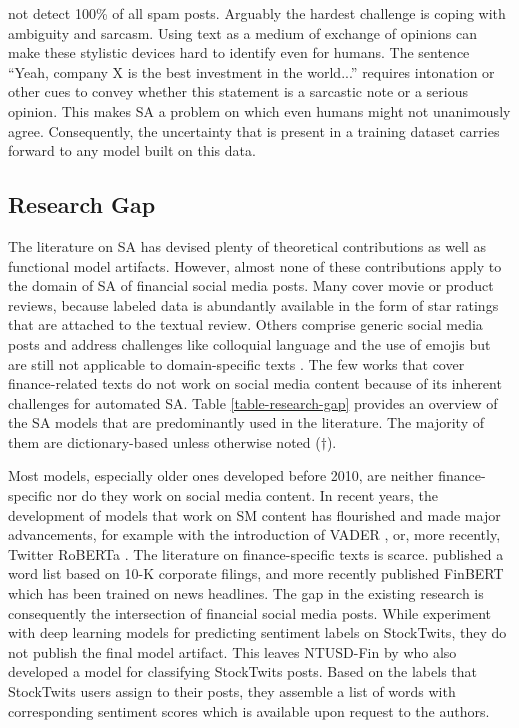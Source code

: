 not detect 100\% of all spam posts. Arguably the hardest challenge is coping with ambiguity and sarcasm. Using text as a medium of exchange of opinions can make these stylistic devices hard to identify even for humans. The sentence ``Yeah, company X is the best investment in the world...'' requires intonation or other cues to convey whether this statement is a sarcastic note or a serious opinion. This makes SA a problem on which even humans might not unanimously agree. Consequently, the uncertainty that is present in a training dataset carries forward to any model built on this data.







\subsection{Research Gap}
\label{section-research-gap}
The literature on SA has devised plenty of theoretical contributions as well as functional model artifacts. However, almost none of these contributions apply to the domain of SA of financial social media posts. Many cover movie or product reviews, because labeled data is abundantly available in the form of star ratings that are attached to the textual review. Others comprise generic social media posts and address challenges like colloquial language and the use of emojis but are still not applicable to domain-specific texts . The few works that cover finance-related texts \cite{loughranMcD2011, araci2019finbert}  do not work on social media content because of its inherent challenges for automated SA. Table \ref{table-research-gap} provides an overview of the SA models that are predominantly used in the literature. The majority of them are dictionary-based unless otherwise noted ($\dagger$).



Most models, especially older ones developed before 2010, are neither finance-specific nor do they work on social media content. In recent years, the development of models that work on SM content has flourished and made major advancements, for example with the introduction of VADER , or, more recently, Twitter RoBERTa . The literature on finance-specific texts is scarce.  published a word list based on 10-K corporate filings, and more recently  published FinBERT which has been trained on news headlines. The gap in the existing research is consequently the intersection of financial social media posts. While  experiment with deep learning models for predicting sentiment labels on StockTwits, they do not publish the final model artifact. This leaves NTUSD-Fin by  who also developed a model for classifying StockTwits posts. Based on the labels that StockTwits users assign to their posts, they assemble a list of words with corresponding sentiment scores which is available upon request to the authors.

